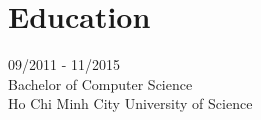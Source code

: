 \section*{Education}

09/2011 - 11/2015\\
Bachelor of Computer Science\\
Ho Chi Minh City University of Science